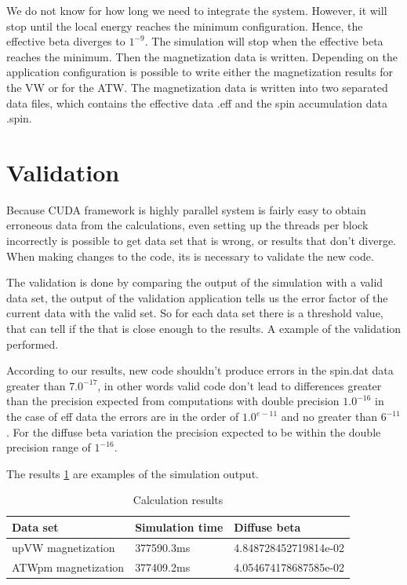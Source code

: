 We do not know for how long we need to integrate the system. However, it will stop until the local energy reaches the minimum configuration. Hence, the effective beta diverges to $1^{-9}$. The simulation will stop when the effective beta reaches the minimum. Then the magnetization data is written. Depending on the application configuration is possible to write either the magnetization results for the VW or for the ATW. The magnetization data is written into two separated data files, which contains the effective data .eff and the spin accumulation data .spin.

\section{Validation}

Because CUDA framework is highly parallel system is fairly easy to obtain erroneous data from the calculations, even setting up the threads per block incorrectly is possible to get data set that is wrong, or results that don't diverge. When making changes to the code, its is necessary to validate the new code.

The validation is done by comparing the output of the simulation with a valid data set, the output of the validation application tells us the error factor of the current data with the valid set. So for each data set there is a threshold value, that can tell if the that is close enough to the results. A example of the validation performed.

According to our results, new code shouldn't produce errors in the spin.dat data greater than $7.0^{-17}$, in other words valid code don't lead to differences greater than the precision expected from computations with double precision $1.0^{-16}$ in the case of eff data the errors are in the order of $1.0^{e-11}$ and no greater than $6^{-11}$. For the diffuse beta variation the precision expected to be within the double precision range of $1^{-16}$. 

The results \ref{tab:results} are examples of the simulation output.

\begin{table}[h]
\centering
\begin{tabular}{| l | l | l |}
\hline
Data set & Simulation time & Diffuse beta  \\
\hline
upVW magnetization & 377590.3ms & 4.848728452719814e-02 \\
\hline
ATWpm magnetization & 377409.2ms & 4.054674178687585e-02 \\
\hline
\end{tabular}
\caption{Calculation results}
\label{tab:results}
\end{table}


